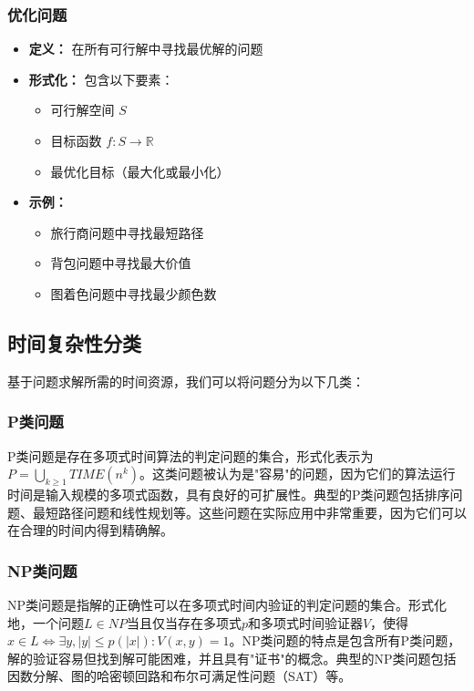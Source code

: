 \documentclass[a4paper,12pt]{ctexart}
\begin{document}
\subsubsection{优化问题}
\begin{itemize}
    \item \textbf{定义：} 在所有可行解中寻找最优解的问题
    \item \textbf{形式化：} 包含以下要素：
        \begin{itemize}
            \item 可行解空间 $S$
            \item 目标函数 $f: S \rightarrow \mathbb{R}$
            \item 最优化目标（最大化或最小化）
        \end{itemize}
    \item \textbf{示例：}
        \begin{itemize}
            \item 旅行商问题中寻找最短路径
            \item 背包问题中寻找最大价值
            \item 图着色问题中寻找最少颜色数
        \end{itemize}
\end{itemize}

\subsection{时间复杂性分类}
基于问题求解所需的时间资源，我们可以将问题分为以下几类：

\subsubsection{P类问题}
P类问题是存在多项式时间算法的判定问题的集合，形式化表示为$P = \bigcup_{k \geq 1} TIME(n^k)$。这类问题被认为是"容易"的问题，因为它们的算法运行时间是输入规模的多项式函数，具有良好的可扩展性。典型的P类问题包括排序问题、最短路径问题和线性规划等。这些问题在实际应用中非常重要，因为它们可以在合理的时间内得到精确解。

\subsubsection{NP类问题}
NP类问题是指解的正确性可以在多项式时间内验证的判定问题的集合。形式化地，一个问题$L \in NP$当且仅当存在多项式$p$和多项式时间验证器$V$，使得$x \in L \iff \exists y, |y| \leq p(|x|): V(x,y) = 1$。NP类问题的特点是包含所有P类问题，解的验证容易但找到解可能困难，并且具有"证书"的概念。典型的NP类问题包括因数分解、图的哈密顿回路和布尔可满足性问题（SAT）等。
\end{document}
